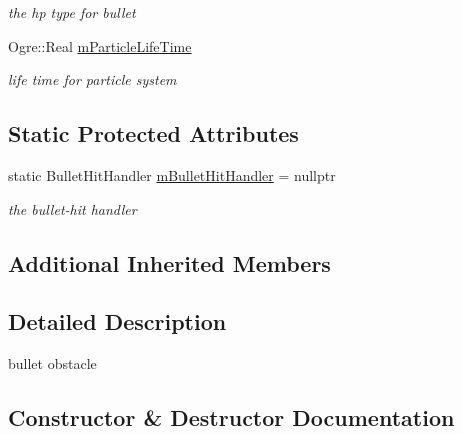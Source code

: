 \begin{DoxyCompactItemize}
\begin{DoxyCompactList}\small\item\em the hp type for bullet \end{DoxyCompactList}\item 
Ogre\+::\+Real \hyperlink{class_n_c_t_u_1_1_bullet_obstacle_a95dac20c5d14bb5db86aa18835d78004}{m\+Particle\+Life\+Time}\hypertarget{class_n_c_t_u_1_1_bullet_obstacle_a95dac20c5d14bb5db86aa18835d78004}{}\label{class_n_c_t_u_1_1_bullet_obstacle_a95dac20c5d14bb5db86aa18835d78004}

\begin{DoxyCompactList}\small\item\em life time for particle system \end{DoxyCompactList}\end{DoxyCompactItemize}
\subsection*{Static Protected Attributes}
\begin{DoxyCompactItemize}
\item 
static Bullet\+Hit\+Handler \hyperlink{class_n_c_t_u_1_1_bullet_obstacle_a1756674a45f79c57e9815756fecc55f4}{m\+Bullet\+Hit\+Handler} = nullptr\hypertarget{class_n_c_t_u_1_1_bullet_obstacle_a1756674a45f79c57e9815756fecc55f4}{}\label{class_n_c_t_u_1_1_bullet_obstacle_a1756674a45f79c57e9815756fecc55f4}

\begin{DoxyCompactList}\small\item\em the bullet-\/hit handler \end{DoxyCompactList}\end{DoxyCompactItemize}
\subsection*{Additional Inherited Members}


\subsection{Detailed Description}
bullet obstacle 

\subsection{Constructor \& Destructor Documentation}
